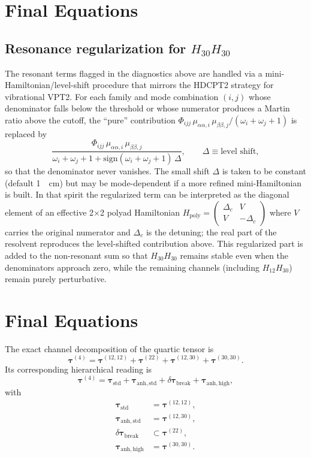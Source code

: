 \documentclass[aip,jcp,reprint]{revtex4-2}
\begin{document}
\begin{widetext}
\section{Final Equations}
\subsection{Resonance regularization for \texorpdfstring{$H_{30}H_{30}$}{H30H30}}\label{app:H30resonance}

The resonant terms flagged in the diagnostics above are handled via a
mini-Hamiltonian/level-shift procedure that mirrors the HDCPT2
strategy for vibrational VPT2. For each family and mode combination
$(i,j)$ whose denominator falls below the threshold or whose numerator
produces a Martin ratio above the cutoff, the “pure” contribution
$\Phi_{ijj}\,\mu_{\alpha\alpha,i}\,\mu_{\beta\beta,j}/(\omega_i+\omega_j+1)$
is replaced by
\[
\frac{\Phi_{ijj}\,\mu_{\alpha\alpha,i}\,\mu_{\beta\beta,j}}
{\omega_i+\omega_j+1+\mathrm{sign}(\omega_i+\omega_j+1)\,\Delta},
\qquad
\Delta \equiv \text{level shift},
\]
so that the denominator never vanishes. The small shift $\Delta$ is
taken to be constant (default \SI{1}{\per\cm}) but may be mode-dependent
if a more refined mini-Hamiltonian is built. In that spirit the regularized
term can be interpreted as the diagonal element of an effective 2×2
polyad Hamiltonian $H_{\mathrm{poly}} = \begin{pmatrix}
\Delta_c & V \\
V & -\Delta_c
\end{pmatrix}$ where $V$ carries the original numerator and
$\Delta_c$ is the detuning; the real part of the resolvent reproduces the
level-shifted contribution above. This regularized part is added to the
non-resonant sum so that $H_{30}H_{30}$ remains stable even when the
denominators approach zero, while the remaining channels (including
$H_{12}H_{30}$) remain purely perturbative.

\section{Final Equations}
The exact channel decomposition of the quartic tensor is
\begin{equation}
\bm{\tau}^{(4)}
=
\bm{\tau}^{(12,12)}
+
\bm{\tau}^{(22)}
+
\bm{\tau}^{(12,30)}
+
\bm{\tau}^{(30,30)}.
\end{equation}
Its corresponding hierarchical reading is
\begin{equation}
\bm{\tau}^{(4)}
=
\bm{\tau}_{\mathrm{std}}
+
\bm{\tau}_{\mathrm{anh,std}}
+
\delta\bm{\tau}_{\mathrm{break}}
+
\bm{\tau}_{\mathrm{anh,high}},
\end{equation}
with
\begin{align}
\bm{\tau}_{\mathrm{std}} &= \bm{\tau}^{(12,12)}, \\
\bm{\tau}_{\mathrm{anh,std}} &= \bm{\tau}^{(12,30)}, \\
\delta\bm{\tau}_{\mathrm{break}} &\subset \bm{\tau}^{(22)}, \\
\bm{\tau}_{\mathrm{anh,high}} &= \bm{\tau}^{(30,30)}.
\end{align}


\end{widetext}
\end{document}
